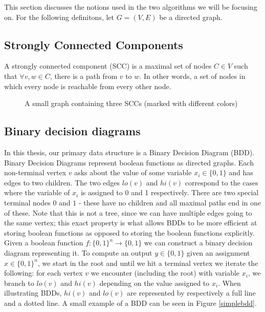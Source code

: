 \documentclass[../master/master.tex]{subfiles}
\begin{document}
This section discusses the notions used in the two algorithms we will be focusing on. For the following definitons, let $G=(V,E)$ be a directed graph.

\subsection{Strongly Connected Components}
A strongly connected component (SCC) is a maximal set of nodes $C\in V$ such that $\forall v,w\in C$, there is a path from $v$ to $w$. In other words, a set of nodes in which every node is reachable from every other node.
\begin{figure}[H]
\center
{}
\caption{A small graph containing three SCCs (marked with different colors)}
\end{figure}

\subsection{Binary decision diagrams}
In this thesis, our primary data structure is a Binary Decision Diagram (BDD). Binary Decision Diagrams represent boolean functions as directed graphs. Each non-terminal vertex $v$ asks about the value of some variable $x_i\in \{0,1\}$ and has edges to two children. The two edges $lo(v)$ and $hi(v)$ correspond to the cases where the variable of $x_i$ is assigned to 0 and 1 respectively. There are two special terminal nodes $0$ and $1$ - these have no children and all maximal paths end in one of these. Note that this is not a tree, since we can have multiple edges going to the same vertex; this exact property is what allows BDDs to be more efficient at storing boolean functions as opposed to storing the boolean functions explicitly.
Given a boolean function $f: \{0,1\}^n \rightarrow \{0,1\}$ we can construct a binary decision diagram representing it. To compute an output $y\in \{0,1\}$ given an assignment  $x\in\{0,1\}^n$, we start in the root and until we hit a terminal vertex we iterate the following: for each vertex $v$ we encounter (including the root) with variable $x_i$, we branch to $lo(v)$ and $hi(v)$ depending on the value assigned to $x_i$. When illustrating BDDs, $hi(v)$ and $lo(v)$ are represented by respectively a full line and a dotted line. A small example of a BDD can be seen in Figure \ref{simplebdd}.
\end{document}
